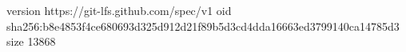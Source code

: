 version https://git-lfs.github.com/spec/v1
oid sha256:b8e4853f4ce680693d325d912d21f89b5d3cd4dda16663ed3799140ca14785d3
size 13868
